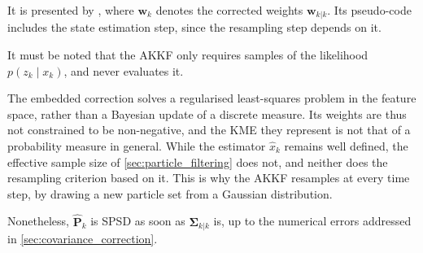 It is presented by , where $\mathbf{w}_k$ denotes the corrected weights $\mathbf{w}_{k|k}$. Its pseudo-code includes the state estimation step, since the resampling step depends on it.

\begin{algorithm}[!htb]
	\begin{algorithmic}
	\end{algorithmic}\caption{Adaptive Kernel Kalman Filter}\label{alg:AKKF}
\end{algorithm}

It must be noted that the AKKF only requires samples of the likelihood $p(z_k\mid x_k)$, and never evaluates it.

\begin{remark}
	The embedded correction solves a regularised least-squares problem in the feature space, rather than a Bayesian update of a discrete measure. Its weights are thus not constrained to be non-negative, and the KME they represent is not that of a probability measure in general. While the estimator $\hat{x}_k$ remains well defined, the effective sample size of \cref{sec:particle_filtering} does not, and neither does the resampling criterion based on it. This is why the AKKF resamples at every time step, by drawing a new particle set from a Gaussian distribution.

	Nonetheless, $\hat{\mathbf{P}}_k$ is SPSD as soon as $\boldsymbol{\Sigma}_{k|k}$ is, up to the numerical errors addressed in \cref{sec:covariance_correction}.
\end{remark}

